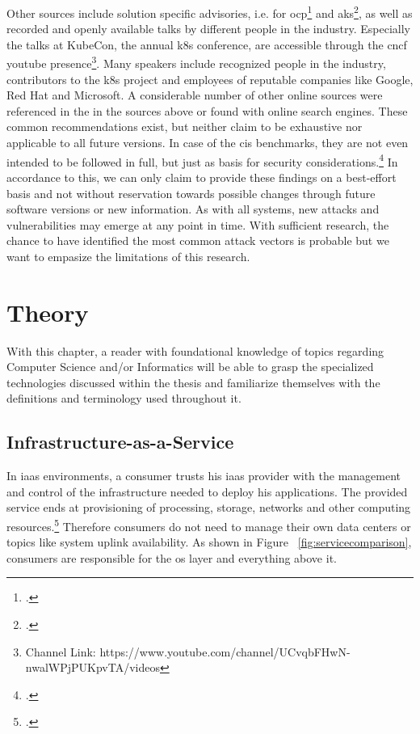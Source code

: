 Other sources include solution specific advisories, i.e. for \gls{ocp}\footcite{ocpSecTips} and \gls{aks}\footcite{aksSecTips}, as well as recorded and openly available talks by different people in the industry. Especially the talks at KubeCon, the annual \gls{k8s} conference, are accessible through the \gls{cncf} youtube presence\footnote{Channel Link: https://www.youtube.com/channel/UCvqbFHwN-nwalWPjPUKpvTA/videos}. Many speakers include recognized people in the industry, contributors to the \gls{k8s} project and employees of reputable companies like Google, Red Hat and Microsoft.
A considerable number of other online sources were referenced in the in the sources above or found with online search engines.
These common recommendations exist, but neither claim to be exhaustive nor applicable to all future versions. In case of the \gls{cis} benchmarks, they are not even intended to be followed in full, but just as basis for security considerations.\footcite{cisJustRecommendation}
In accordance to this, we can only claim to provide these findings on a best-effort basis and not without reservation towards possible changes through future software versions or new information.
As with all systems, new attacks and vulnerabilities may emerge at any point in time. With sufficient research, the chance to have identified the most common attack vectors is probable but we want to empasize the limitations of this research.


\chapter{Theory}
With this chapter, a reader with foundational knowledge of topics regarding Computer Science and/or Informatics 
will be able to grasp the specialized technologies discussed within the thesis and familiarize themselves with the definitions and terminology used throughout it.

\section{Infrastructure-as-a-Service}
In \gls{iaas} environments, a consumer trusts his \gls{iaas} provider with the management and control of the infrastructure needed to deploy his applications.
The provided service ends at provisioning of processing, storage, networks and other computing resources.\footcite{nistcloud}
Therefore consumers do not need to manage their own data centers or topics like system uplink availability.
As shown in Figure ~\ref{fig:servicecomparison}, consumers are responsible for the \gls{os} layer and everything above it.


